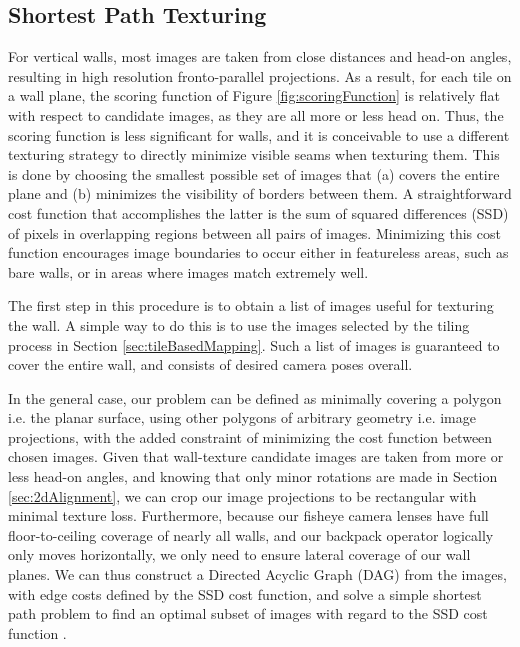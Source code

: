 \documentclass[]{spie}  %
\begin{document}
\subsection{Shortest Path Texturing}
\label{sec:shortestPath}
For vertical walls, most images are taken from close distances and
head-on angles, resulting in high resolution fronto-parallel
projections. As a result, for each tile on a wall plane, the scoring
function of Figure \ref{fig:scoringFunction} is relatively flat with
respect to candidate images, as they are all more or less head
on. Thus, the scoring function is less significant for walls, and it
is conceivable to use a different texturing strategy to directly
minimize visible seams when texturing them. This is done by choosing
the smallest possible set of images that (a) covers the entire plane
and (b) minimizes the visibility of borders between them. A
straightforward cost function that accomplishes the latter is the sum
of squared differences (SSD) of pixels in overlapping regions between
all pairs of images. Minimizing this cost function encourages image
boundaries to occur either in featureless areas, such as bare walls,
or in areas where images match extremely well.

The first step in this procedure is to obtain a list of images useful
for texturing the wall. A simple way to do this is to use the images
selected by the tiling process in Section
\ref{sec:tileBasedMapping}. Such a list of images is guaranteed to
cover the entire wall, and consists of desired camera poses overall.

In the general case, our problem can be defined as minimally covering
a polygon i.e. the planar surface, using other polygons of arbitrary
geometry i.e. image projections, with the added constraint of
minimizing the cost function between chosen images. Given that
wall-texture candidate images are taken from more or less head-on
angles, and knowing that only minor rotations are made in Section
\ref{sec:2dAlignment}, we can crop our image projections to be
rectangular with minimal texture loss. Furthermore, because our
fisheye camera lenses have full floor-to-ceiling coverage of nearly
all walls, and our backpack operator logically only moves
horizontally, we only need to ensure lateral coverage of our wall
planes. We can thus construct a Directed Acyclic Graph (DAG) from the
images, with edge costs defined by the SSD cost function, and solve a
simple shortest path problem to find an optimal subset of images with
regard to the SSD cost function \cite{dijkstra}.
\end{document}
